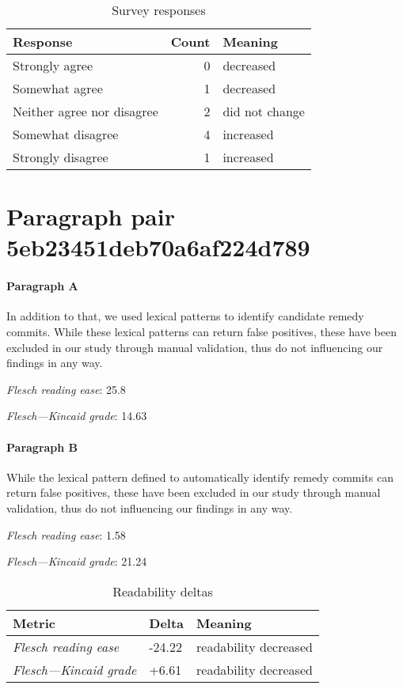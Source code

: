 \begin{table}[!h]
\centering
\begin{tabular}{lrl}
\toprule
          \textbf{Response} &  \textbf{Count} & \textbf{Meaning} \\
\midrule
             Strongly agree &               0 &        decreased \\
             Somewhat agree &               1 &        decreased \\
 Neither agree nor disagree &               2 &   did not change \\
          Somewhat disagree &               4 &        increased \\
          Strongly disagree &               1 &        increased \\
\bottomrule
\end{tabular}
\caption*{Survey responses}\end{table}


\newpage
\section{Paragraph pair 5eb23451deb70a6af224d789}
\paragraph{Paragraph A}
In addition to that, we used lexical patterns to identify candidate remedy commits. While these lexical patterns can return false positives, these have been excluded in our study through manual validation, thus do not influencing our findings in any way.\par\medskip
\emph{Flesch reading ease}: 25.8\par
\emph{Flesch---Kincaid grade}: 14.63

\paragraph{Paragraph B}
While the lexical pattern defined to automatically identify remedy commits can return false positives, these have been excluded in our study through manual validation, thus do not influencing our findings in any way.\par\medskip
\emph{Flesch reading ease}: 1.58\par
\emph{Flesch---Kincaid grade}: 21.24

\bigskip\begin{table}[!h]
\centering
\begin{tabular}{lll}
\toprule
               \textbf{Metric} & \textbf{Delta} &       \textbf{Meaning} \\
\midrule
    \emph{Flesch reading ease} &         -24.22 &  readability decreased \\
 \emph{Flesch---Kincaid grade} &          +6.61 &  readability decreased \\
\bottomrule
\end{tabular}
\caption*{Readability deltas}\end{table}

